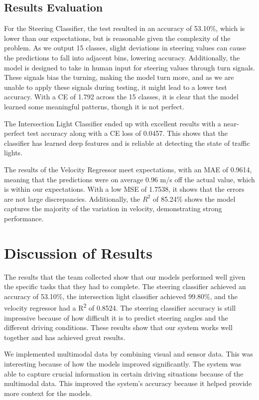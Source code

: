 \documentclass{article} %
\begin{document}
\subsection{Results Evaluation}
For the Steering Classifier, the test resulted in an accuracy of 53.10\%, 
which is lower than our expectations, but is reasonable given the complexity of the problem. As we output 15 classes, 
slight deviations in steering values can cause the predictions to fall into adjacent bins, lowering accuracy. 
Additionally, the model is designed to take in human input for steering values through turn signals. 
These signals bias the turning, making the model turn more, and as we are unable to apply these signals during testing, 
it might lead to a lower test accuracy. With a CE of 1.792 across the 15 classes, it is clear that the model learned some meaningful patterns, 
though it is not perfect.

The Intersection Light Classifier ended up with excellent results with a near-perfect test accuracy along with a CE loss of 0.0457. 
This shows that the classifier has learned deep features and is reliable at detecting the state of traffic lights. 

The results of the Velocity Regressor meet expectations, with an MAE of 0.9614, meaning that the predictions were on average 0.96 m/s 
off the actual value, which is within our expectations. With a low MSE of 1.7538, it shows that the errors are not large discrepancies. 
Additionally, the $R^2$ of 85.24\% shows the model captures the majority of the variation in velocity, demonstrating strong performance. 


\section{Discussion of Results}

The results that the team collected show that our models performed well given the specific tasks that
they had to complete. The steering classifier achieved an accuracy of 53.10\%, the intersection light
classifier achieved 99.80\%, and the velocity regressor had a R\textsuperscript{2} of 0.8524. The steering
classifier accuracy is still impressive because of how difficult it is to predict steering angles and
the different driving conditions. These results show that our system works well together and has
achieved great results.

We implemented multimodal data by combining visual and sensor data. This was interesting because of how
the models improved significantly. The system was able to capture crucial information in certain driving
situations because of the multimodal data. This improved the system’s accuracy because it helped provide
more context for the models.
\end{document}
